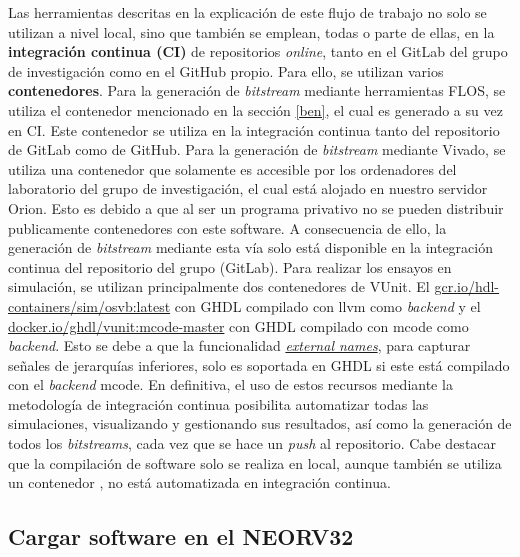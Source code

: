Las herramientas descritas en la explicación de este flujo de trabajo no solo se utilizan a nivel local, sino que también se emplean, todas o parte de ellas, en la \textbf{integración continua (CI)} de repositorios \textit{online}, tanto en el GitLab del grupo de investigación como en el GitHub propio.
Para ello, se utilizan varios \textbf{contenedores}.
Para la generación de \textit{bitstream} mediante herramientas FLOS, se utiliza el contenedor mencionado en la sección \ref{ben}, el cual es generado a su vez en CI.
Este contenedor se utiliza en la integración continua tanto del repositorio de GitLab como de GitHub.
Para la generación de \textit{bitstream} mediante Vivado, se utiliza una contenedor que solamente es accesible por los ordenadores del laboratorio del grupo de investigación, el cual está alojado en nuestro servidor Orion.
Esto es debido a que al ser un programa privativo no se pueden distribuir publicamente contenedores con este software. A consecuencia de ello, la generación de \textit{bitstream} mediante esta vía solo está disponible en la integración continua del repositorio del grupo (GitLab).
Para realizar los ensayos en simulación, se utilizan principalmente dos contenedores de VUnit.
El \href{https://console.cloud.google.com/gcr/images/hdl-containers/global/sim/osvb}{gcr.io/hdl-containers/sim/osvb:latest} con GHDL compilado con llvm como \textit{backend} y el \href{https://hub.docker.com/layers/ghdl/vunit/mcode-master/images/sha256-e32029c5be70a5fa0fc94bffd15d72fa8b84ad8aaf2dc7cfa8ab8324ef733ed0?context=explore}{docker.io/ghdl/vunit:mcode-master} con GHDL compilado con mcode como \textit{backend}.
Esto se debe a que la funcionalidad \href{https://github.com/stnolting/neorv32/discussions/886}{\textit{external names}}, para capturar señales de jerarquías inferiores, solo es soportada en GHDL si este está compilado con el \textit{backend} mcode.
En definitiva, el uso de estos recursos mediante la metodología de integración continua posibilita automatizar todas las simulaciones, visualizando y gestionando sus resultados, así como la generación de todos los \textit{bitstreams}, cada vez que se hace un \textit{push} al repositorio.
Cabe destacar que la compilación de software solo se realiza en local, aunque también se utiliza un contenedor \cite{gh:sim-conatiner}, no está automatizada en integración continua.

\subsection{Cargar software en el NEORV32}

